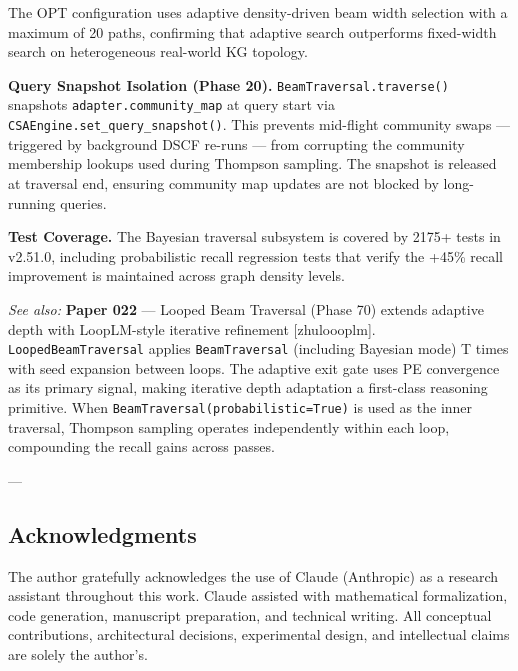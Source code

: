 The OPT confi\-guration uses adaptive density-driven beam width selection with a maximum of 20 paths, confirming that adaptive search outperforms fixed-width search on heter\-ogeneous real-world KG topology.

\textbf{Query Snapshot Isolation (Phase 20).} \texttt{BeamTraversal.traverse()} snapshots \texttt{adapter.community\_map} at query start via \texttt{CSAEngine.set\_query\_snapshot()}. This prevents mid-flight community swaps — triggered by background DSCF re-runs — from corrupting the community membership lookups used during Thompson sampling. The snapshot is released at traversal end, ensuring community map updates are not blocked by long-running queries.

\textbf{Test Coverage.} The Bayesian traversal subsystem is covered by 2175+ tests in v2.51.0, including proba\-bilistic recall regression tests that verify the +45\% recall improvement is maintained across graph density levels.

\textit{See also:} \textbf{Paper 022} — Looped Beam Traversal (Phase 70) extends adaptive depth with LoopLM-style iterative refinement [zhu\-loooplm]. \texttt{LoopedBeamTraversal} applies \texttt{BeamTraversal} (including Bayesian mode) T times with seed expansion between loops. The adaptive exit gate uses PE convergence as its primary signal, making iterative depth adaptation a first-class reasoning primitive. When \texttt{BeamTraversal(probabilistic=True)} is used as the inner traversal, Thompson sampling operates indep\-endently within each loop, compounding the recall gains across passes.

---
\subsection{Acknow\-ledgments}

The author gratefully ackno\-wledges the use of Claude (Anthropic) as a research assistant throughout this work. Claude assisted with mathe\-matical forma\-lization, code generation, manuscript preparation, and technical writing. All conceptual contr\-ibutions, archi\-tectural decisions, exper\-imental design, and intel\-lectual claims are solely the author's.

